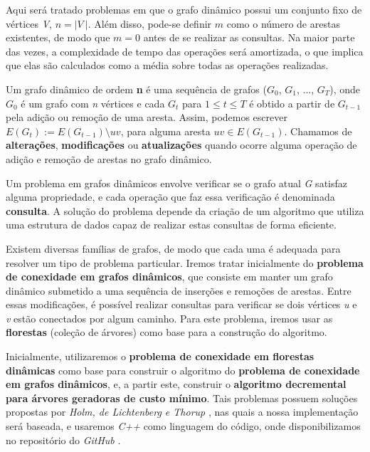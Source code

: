 Aqui será tratado problemas em que o grafo dinâmico possui um conjunto fixo de vértices \textit{V}, $n = |\textit{V}\ |$. Além disso, pode-se definir $m$ como o número de arestas existentes, de modo que $m = 0$ antes de se realizar as consultas. Na maior parte das vezes, a complexidade de tempo das operações será amortizada, o que implica que elas são calculados como a média sobre todas as operações realizadas. 


Um grafo dinâmico de ordem \textbf{n} é uma sequência de grafos ($G_0$, $G_1$, ..., $G_T$), onde $G_0$ é um grafo com \textit{n} vértices e cada $G_t$ para $1 \leq t \leq T$ é obtido a partir de $G_{t-1}$ pela adição ou remoção de uma aresta. Assim, podemos escrever $E(G_{t}) := E(G_{t - 1}) \setminus {uv}$, para alguma aresta $uv \in E(G_{t-1})$. Chamamos de \textbf{alterações}, \textbf{modificações} ou \textbf{atualizações} quando ocorre alguma operação de adição e remoção de arestas no grafo dinâmico.

Um problema em grafos dinâmicos envolve verificar se o grafo atual \textit{G} satisfaz alguma propriedade, e cada operação que faz essa verificação é denominada \textbf{consulta}. A solução do problema depende da criação de um algoritmo que utiliza uma estrutura de dados capaz de realizar estas consultas de forma eficiente. 

Existem diversas famílias de grafos, de modo que cada uma é adequada para resolver um tipo de problema particular. Iremos tratar inicialmente do \textbf{problema de conexidade em grafos dinâmicos}, que consiste em manter um grafo dinâmico submetido a uma sequência de inserções e remoções de arestas. Entre essas modificações, é possível realizar consultas para verificar se dois vértices \textit{u} e \textit{v} estão conectados por algum caminho. Para este problema, iremos usar as \textbf{florestas} (coleção de árvores) como base para a construção do algoritmo.

Inicialmente, utilizaremos o \textbf{problema de conexidade em florestas dinâmicas} como base para construir o algoritmo do \textbf{problema de conexidade em grafos dinâmicos}, e, a partir este, construir o \textbf{algoritmo decremental para árvores geradoras de custo mínimo}. Tais problemas possuem soluções propostas por \textit{Holm, de Lichtenberg e Thorup} \cite{jacob_holm}, nas quais a nossa implementação será baseada, e usaremos \textit{C++} como linguagem do código, onde disponibilizamos no repositório do \textit{GitHub} \cite{chung2025}.